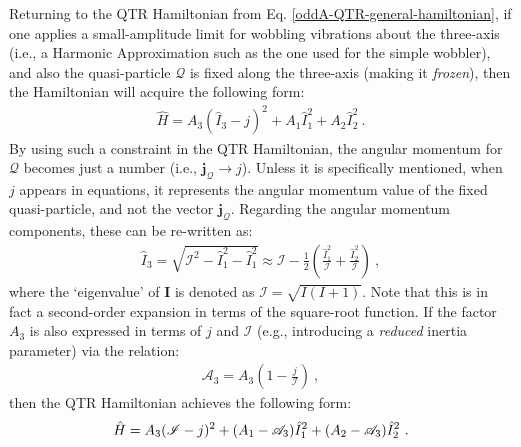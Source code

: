 Returning to the QTR Hamiltonian from Eq. \ref{oddA-QTR-general-hamiltonian}, if one applies a small-amplitude limit for wobbling vibrations about the three-axis (i.e., a Harmonic Approximation such as the one used for the simple wobbler), and also the quasi-particle $\mathcal{Q}$ is fixed along the three-axis (making it \emph{frozen}), then the Hamiltonian will acquire the following form:
\begin{align}
    \hat{H}=A_3(\hat{I}_3-j)^2+A_1\hat{I}_1^2+A_2\hat{I}_2^2\ .
    \label{hamiltonian-qtr-FA}
\end{align}
By using such a constraint in the QTR Hamiltonian, the angular momentum for $\mathcal{Q}$ becomes just a number (i.e., $\mathbf{j}_{\mathcal{Q}}\to j$). Unless it is specifically mentioned, when $j$ appears in equations, it represents the angular momentum value of the fixed quasi-particle, and not the vector $\mathbf{j}_\mathcal{Q}$. Regarding the angular momentum components, these can be re-written as:
\begin{align}
    \hat{I}_3=\sqrt{\mathscr{I}^2-\hat{I}_1^2-\hat{I}_1^2}\approx\mathscr{I}-\frac{1}{2}\left(\frac{\hat{I}_1^2}{\mathscr{I}}+\frac{\hat{I}_2^2}{\mathscr{I}}\right)\ ,
\end{align}
where the `eigenvalue' of $\mathbf{I}$ is denoted as $\mathscr{I}=\sqrt{I(I+1)}$. Note that this is in fact a second-order expansion in terms of the square-root function. If the factor $A_3$ is also expressed in terms of $j$ and $\mathscr{I}$ (e.g., introducing a \emph{reduced} inertia parameter) via the relation:
\begin{align}
    \mathscr{A}_3=A_3\left(1-\frac{j}{\mathscr{I}}\right)\ ,
    \label{reduced-inertia-parameter-A3}
\end{align}
then the QTR Hamiltonian achieves the following form:
\begin{align}
    \hat{H}={\color{black}A_3(\mathscr{I}-j)^2}+{\color{black}(A_1-\mathscr{A}_3)\hat{I}_1^2+(A_2-\mathscr{A}_3)\hat{I}_2^2}\ .
    \label{HA-QTR-Hamiltonian}
\end{align}

